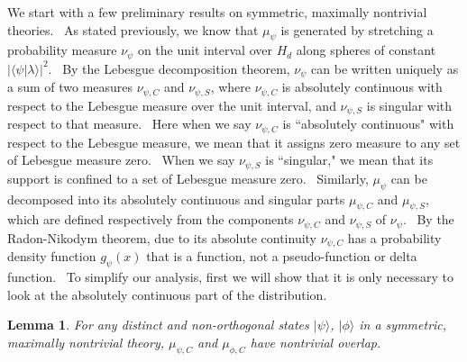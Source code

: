 \documentclass[letterpaper,12pt]{article}
\newtheorem{lem}{Lemma}
\begin{document}
We start with a few preliminary results on symmetric, maximally nontrivial theories. \
As stated previously, we know that $\mu_\psi$ is generated by stretching a
probability measure $\nu_\psi$ on the unit interval over $H_d$ along spheres
of constant $| \langle \psi | \lambda \rangle |^2$. \ By the Lebesgue
decomposition theorem, $\nu_\psi$ can be written uniquely as a sum of two
measures $\nu_{\psi, C}$ and $\nu_{\psi, S}$, where $\nu_{\psi ,C}$ is
absolutely continuous with respect to the Lebesgue measure over the unit
interval, and $\nu_{\psi, S}$ is singular with respect to that measure. \ Here when we say $\nu_{\psi, C}$ is ``absolutely continuous" with respect to the Lebesgue measure, we mean that it assigns zero measure to any set of Lebesgue measure zero. \ When we say $\nu_{\psi, S}$ is ``singular," we mean that its support is confined to a set of Lebesgue measure zero. \ Similarly, $\mu_{\psi}$ can be decomposed into its absolutely continuous and singular parts $\mu_{\psi,C}$ and $\mu_{\psi,S}$, which are defined respectively from the components $\nu_{\psi,C}$ and $\nu_{\psi,S}$ of $\nu_{\psi}$. \ By the Radon-Nikodym theorem, due to its absolute continuity $\nu_{\psi,C}$ has a probability
density function $g_{\psi}(x)$ that is a function, not a
pseudo-function or delta function. \ To simplify our analysis, first we will show that it is only necessary to look at the absolutely
continuous part of the distribution.

\begin{lem}
\label{measure_pos} For any distinct and non-orthogonal states $ | \psi \rangle $, $ | \phi \rangle $ in a
symmetric, maximally nontrivial theory, $\mu_{\psi, C}$ and $\mu_{\phi,C}$ have nontrivial overlap.
\end{lem}
\end{document}
